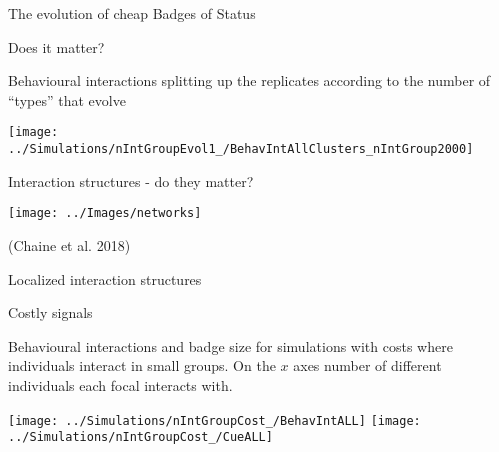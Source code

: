 \documentclass[
  ignorenonframetext,
]{beamer}
\begin{document}
\begin{frame}{The evolution of cheap Badges of Status}
\protect\hypertarget{the-evolution-of-cheap-badges-of-status-4}{}

\begin{block}{Does it matter?}

\small

Behavioural interactions splitting up the replicates according to the
number of ``types'' that evolve

\begin{flushleft}\texttt{[image: ../Simulations/nIntGroupEvol1\_/BehavIntAllClusters\_nIntGroup2000]} \end{flushleft}

\end{block}

\end{frame}

\begin{frame}{Interaction structures - do they matter?}
\protect\hypertarget{interaction-structures---do-they-matter}{}

\begin{center}\texttt{[image: ../Images/networks]} \end{center}

(Chaine et al. 2018)

\end{frame}

\begin{frame}{Localized interaction structures}
\protect\hypertarget{localized-interaction-structures}{}

\begin{block}{Costly signals}

\tiny

Behavioural interactions and badge size for simulations with costs where
individuals interact in small groups. On the \(x\) axes number of
different individuals each focal interacts with.

\begin{center}\texttt{[image: ../Simulations/nIntGroupCost\_/BehavIntALL]} \texttt{[image: ../Simulations/nIntGroupCost\_/CueALL]} \end{center}

\end{block}

\end{frame}
\end{document}
